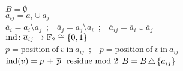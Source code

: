 
\begin{algorithm} [H]
	$B = \emptyset$\\
	{
		$a_{ij} = a_i \cup a_j$\\
		{
			$\overline{a}_i = a_i \setminus a_j$\ ;\ \
			$\overline{a}_j = a_j \setminus a_i$\ ;\ \
			$\overline{a}_{ij} = \overline{a}_i \cup \overline{a}_j$ \\
			$\mathrm{ind} \colon \overline{a}_{ij} \to {\mathbb{F}_2} \cong \{0,1\}$ \\
			\ForAll {$v \in \overline{a}_{ij}$}
			{
				$p = \mathrm{position\ of\ } v \mathrm{\ in\ } a_{ij}$\ ;\ \
				$\overline{p} = \mathrm{position\ of\ } v \mathrm{\ in\ } \overline{a}_{ij}$\\
				$\ind(v) = {p}\, +\, \overline{p}\ \ \mathrm{residue\ mod}\ 2$
			}
			{$B = B \operatorname{\triangle} \, \{a_{ij}\}$}
		}
	}
	\caption{}
	\label{a:algorithm}
\end{algorithm}